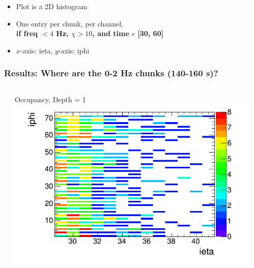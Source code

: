 \documentclass[bigger]{beamer}
\providecommand{\alert}[1]{\textbf{#1}}
\begin{document}
\begin{frame}
\begin{itemize}
\item Plot is a 2D histogram
\label{sec-3-2-1-2}%

\item One entry per chunk, per channel,\\ \alert{if freq $< 4$ Hz, $\chi > 10$, and time $\epsilon$ [30, 60]}
\label{sec-3-2-1-3}%

\item $x$-axis: ieta, $y$-axis: iphi
\label{sec-3-2-1-4}%
\end{itemize} %
\end{frame}
\begin{frame}
\frametitle{Results: Where are the 0-2 Hz chunks (140-160 s)?}
\label{sec-3-2-2}
\begin{columns} %
\label{sec-3-2-2-1}
\begin{column}{0.55\textwidth}
\label{sec-3-2-2-1-1}

\centering
Occupancy, Depth = 1
\includegraphics[width=\textwidth]{fig/occupancy_frequencyUnder4_time140to160_signifOver10_depth1_hist.png}
\end{column}
\begin{column}{0.55\textwidth}
\label{sec-3-2-2-1-2}


\end{column}
\end{columns}
\end{frame}
\end{document}
